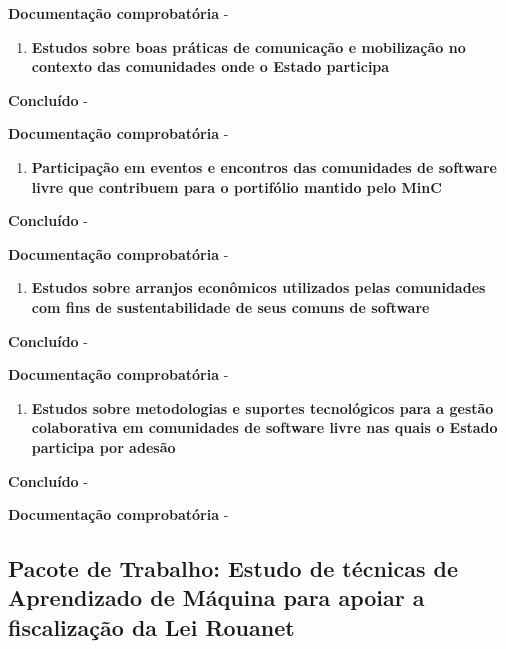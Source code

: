 \textbf{Documentação comprobatória} -

\begin{enumerate}
\def\labelenumi{\arabic{enumi}.}
\setcounter{enumi}{2}
\tightlist
\item
  \textbf{Estudos sobre boas práticas de comunicação e mobilização no
  contexto das comunidades onde o Estado participa}
\end{enumerate}

\textbf{Concluído} -

\textbf{Documentação comprobatória} -

\begin{enumerate}
\def\labelenumi{\arabic{enumi}.}
\setcounter{enumi}{3}
\tightlist
\item
  \textbf{Participação em eventos e encontros das comunidades de
  software livre que contribuem para o portifólio mantido pelo MinC}
\end{enumerate}

\textbf{Concluído} -

\textbf{Documentação comprobatória} -

\begin{enumerate}
\def\labelenumi{\arabic{enumi}.}
\setcounter{enumi}{4}
\tightlist
\item
  \textbf{Estudos sobre arranjos econômicos utilizados pelas comunidades
  com fins de sustentabilidade de seus comuns de software}
\end{enumerate}

\textbf{Concluído} -

\textbf{Documentação comprobatória} -

\begin{enumerate}
\def\labelenumi{\arabic{enumi}.}
\setcounter{enumi}{5}
\tightlist
\item
  \textbf{Estudos sobre metodologias e suportes tecnológicos para a
  gestão colaborativa em comunidades de software livre nas quais o
  Estado participa por adesão}
\end{enumerate}

\textbf{Concluído} -

\textbf{Documentação comprobatória} -

\hypertarget{pacote-de-trabalho-estudo-de-tuxe9cnicas-de-aprendizado-de-muxe1quina-para-apoiar-a-fiscalizauxe7uxe3o-da-lei-rouanet}{%
\subsection{Pacote de Trabalho: Estudo de técnicas de Aprendizado de
Máquina para apoiar a fiscalização da Lei
Rouanet}\label{pacote-de-trabalho-estudo-de-tuxe9cnicas-de-aprendizado-de-muxe1quina-para-apoiar-a-fiscalizauxe7uxe3o-da-lei-rouanet}}

